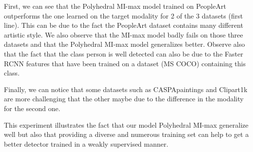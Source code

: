 \documentclass[preprint]{elsarticle}
\newcommand\MILS{MI-max}
\newcommand\MaxOfMaxS{Polyhedral MI-max}
\begin{document}
First, we can see that the \MaxOfMaxS{} model trained on PeopleArt outperforms the one learned on the target modality for 2 of the 3 datasets (first line). This can be due to the fact the PeopleArt dataset contains many different artistic style. We also observe that the \MILS{} model badly fails on those three datasets and that the \MaxOfMaxS{} model generalizes better. Observe also that the fact that the class person is well detected can also be due to the Faster RCNN features that have been trained on a dataset (MS COCO) containing this class.

Finally, we can notice that some datasets such as CASPApaintings and Clipart1k are more challenging that the other maybe due to the difference in the modality for the second one.

This experiment illustrates the fact that our model \MaxOfMaxS{} generalize well but also that providing a diverse and numerous training set can help to get a better detector trained in a weakly supervised manner.


\begin{table*}[h]
\centering
\caption{Mean AP (\%) at IuO 0.5 for the common classes between the source and target sets with the \MILS{} model. In parenthesis the mean performance obtained by learning the detection on the same set (modality).} \label{tab:MILS_KLtransfer}
\end{table*}
\end{document}
